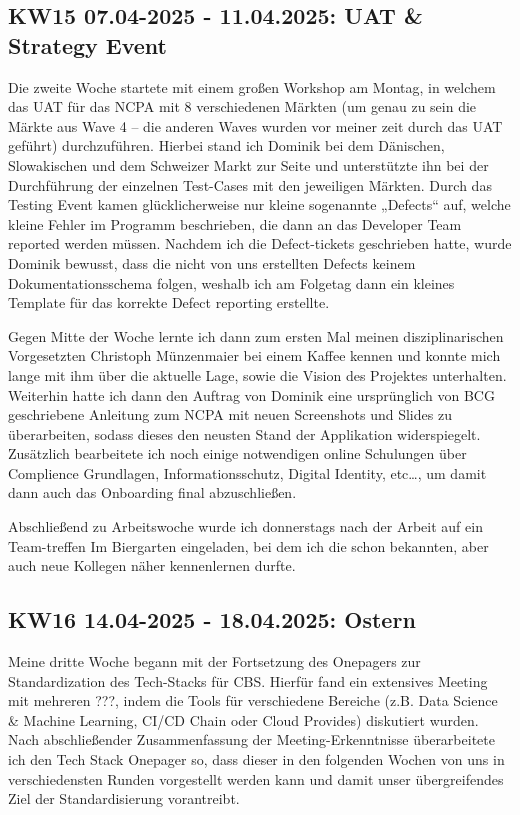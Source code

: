 \subsection{KW15 07.04-2025 - 11.04.2025: UAT \& Strategy Event}
Die zweite Woche startete mit einem großen Workshop am Montag, in welchem das \ac{UAT} für das \ac{NCPA} mit 8 verschiedenen Märkten (um genau zu sein die Märkte aus Wave 4 – die anderen Waves wurden vor meiner zeit durch das \ac{UAT} geführt) durchzuführen. 
Hierbei stand ich Dominik bei dem Dänischen, Slowakischen und dem Schweizer Markt zur Seite und unterstützte ihn bei der Durchführung der einzelnen Test-Cases mit den jeweiligen Märkten. 
Durch das Testing Event kamen glücklicherweise nur kleine sogenannte „Defects“ auf, welche kleine Fehler im Programm beschrieben, die dann an das Developer Team reported werden müssen. 
Nachdem ich die Defect-tickets geschrieben hatte, wurde Dominik bewusst, dass die nicht von uns erstellten Defects keinem Dokumentationsschema folgen, weshalb ich am Folgetag dann ein kleines Template für das korrekte Defect reporting erstellte.

Gegen Mitte der Woche lernte ich dann zum ersten Mal meinen disziplinarischen Vorgesetzten Christoph Münzenmaier bei einem Kaffee kennen und konnte mich lange mit ihm über die aktuelle Lage, sowie die Vision des Projektes unterhalten. 
Weiterhin hatte ich dann den Auftrag von Dominik eine ursprünglich von BCG geschriebene Anleitung zum \ac{NCPA} mit neuen Screenshots und Slides zu überarbeiten, sodass dieses den neusten Stand der Applikation widerspiegelt. 
Zusätzlich bearbeitete ich noch einige notwendigen online Schulungen über Complience Grundlagen, Informationsschutz, Digital Identity, etc…, um damit dann auch das Onboarding final abzuschließen.

Abschließend zu Arbeitswoche wurde ich donnerstags nach der Arbeit auf ein Team-treffen Im Biergarten eingeladen, bei dem ich die schon bekannten, aber auch neue Kollegen näher kennenlernen durfte.


\subsection{KW16 14.04-2025 - 18.04.2025: Ostern}
Meine dritte Woche begann mit der Fortsetzung des Onepagers zur Standardization des Tech-Stacks für \ac{CBS}. 
Hierfür fand ein extensives Meeting mit mehreren ???, indem die Tools für verschiedene Bereiche (z.B. Data Science \& Machine Learning, CI/CD Chain oder Cloud Provides) diskutiert wurden. 
Nach abschließender Zusammenfassung der Meeting-Erkenntnisse überarbeitete ich den Tech Stack Onepager so, dass dieser in den folgenden Wochen von uns in verschiedensten Runden vorgestellt werden kann und damit unser übergreifendes Ziel der Standardisierung vorantreibt.

